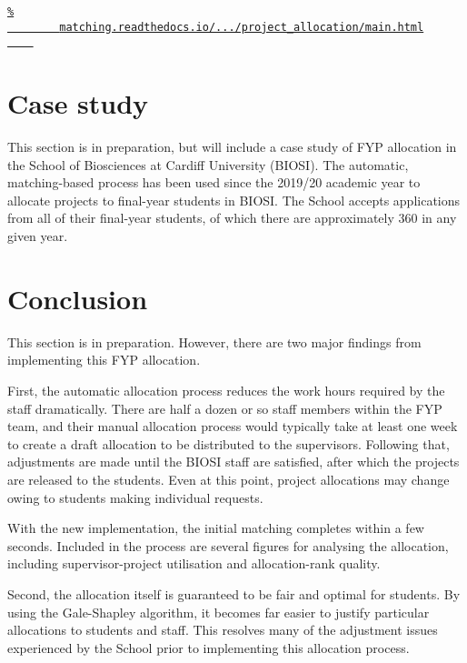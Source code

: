 \begin{center}
\href{https://matching.readthedocs.io/en/latest/tutorials/project_allocation/main.html}{%
    \nolinkurl{%
        matching.readthedocs.io/.../project_allocation/main.html
    }
}
\end{center}

\section{Case study}\label{sec:biosi}

This section is in preparation, but will include a case study of FYP allocation
in the School of Biosciences at Cardiff University (BIOSI). The automatic,
matching-based process has been used since the 2019/20 academic year to allocate
projects to final-year students in BIOSI. The School accepts applications from
all of their final-year students, of which there are approximately \(360\) in
any given year.


\section{Conclusion}\label{sec:conclusion}

This section is in preparation. However, there are two major findings from
implementing this FYP allocation.

First, the automatic allocation process reduces the work hours required by the
staff dramatically. There are half a dozen or so staff members within the FYP
team, and their manual allocation process would typically take at least one week
to create a draft allocation to be distributed to the supervisors. Following
that, adjustments are made until the BIOSI staff are satisfied, after which the
projects are released to the students. Even at this point, project allocations
may change owing to students making individual requests.

With the new implementation, the initial matching completes within a few
seconds. Included in the process are several figures for analysing the
allocation, including supervisor-project utilisation and allocation-rank
quality.

Second, the allocation itself is guaranteed to be fair and optimal for students.
By using the Gale-Shapley algorithm, it becomes far easier to justify particular
allocations to students and staff. This resolves many of the adjustment issues
experienced by the School prior to implementing this allocation process.
